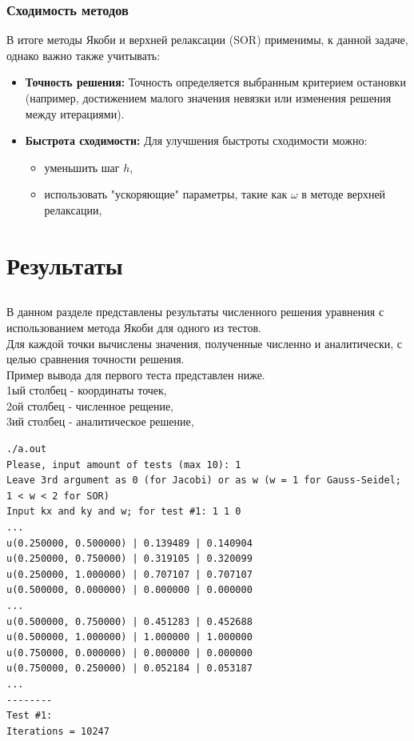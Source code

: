 \documentclass[a4paper, fleqn]{report}
\begin{document}
\subsection*{Сходимость методов}
В итоге методы Якоби и верхней релаксации (SOR) применимы, к данной задаче, однако важно также учитывать:
\begin{itemize}
    \item \textbf{Точность решения:} Точность определяется выбранным критерием остановки (например, достижением малого значения невязки или изменения решения между итерациями).
    \item \textbf{Быстрота сходимости:} Для улучшения быстроты сходимости можно:
    \begin{itemize}
        \item уменьшить шаг $h$,
        \item использовать "ускоряющие" параметры, такие как $\omega$ в методе верхней релаксации,
    \end{itemize}
\end{itemize}
\newpage


\chapter{Результаты}

\section*{}
В данном разделе представлены результаты численного решения уравнения с использованием метода Якоби для одного из тестов. \\
Для каждой точки вычислены значения, полученные численно и аналитически, с целью сравнения точности решения. \\
Пример вывода для первого теста представлен ниже. \\
1ый столбец - координаты точек, \\
2ой столбец - численное рещение, \\
3ий столбец - аналитическое решение, \\

\lstset{language=bash}
\begin{lstlisting}[title={Вывод метода Якоби дл 1го теста (для некоторых точек, покоординатно кратных 0.25)}]
./a.out
Please, input amount of tests (max 10): 1
Leave 3rd argument as 0 (for Jacobi) or as w (w = 1 for Gauss-Seidel; 1 < w < 2 for SOR)
Input kx and ky and w; for test #1: 1 1 0
...
u(0.250000, 0.500000) | 0.139489 | 0.140904
u(0.250000, 0.750000) | 0.319105 | 0.320099
u(0.250000, 1.000000) | 0.707107 | 0.707107
u(0.500000, 0.000000) | 0.000000 | 0.000000
...
u(0.500000, 0.750000) | 0.451283 | 0.452688
u(0.500000, 1.000000) | 1.000000 | 1.000000
u(0.750000, 0.000000) | 0.000000 | 0.000000
u(0.750000, 0.250000) | 0.052184 | 0.053187
...
--------
Test #1:
Iterations = 10247
\end{lstlisting} 
\end{document}
